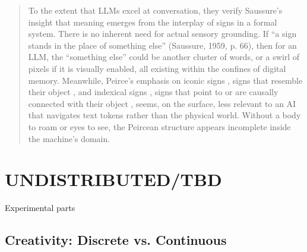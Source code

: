 \begin{quote}
	To the extent that LLMs excel at conversation, they verify Saussure’s insight that meaning emerges from the interplay of signs in a formal system. There is no inherent need for actual sensory grounding. If “a sign stands in the place of something else” (Saussure, 1959, p. 66), then for an LLM, the “something else” could be another cluster of words, or a swirl of pixels if it is visually enabled, all existing within the confines of digital memory. Meanwhile, Peirce’s emphasis on iconic signs , signs that resemble their object , and indexical signs , signs that point to or are causally connected with their object , seems, on the surface, less relevant to an AI that navigates text tokens rather than the physical world. Without a body to roam or eyes to see, the Peircean structure appears incomplete inside the machine’s domain.
	\parencite{filimowicz2025}
\end{quote}


\section{UNDISTRIBUTED/TBD}

\begin{orangebox}
	Experimental parts
\end{orangebox}


\subsection{Creativity: Discrete vs. Continuous}

